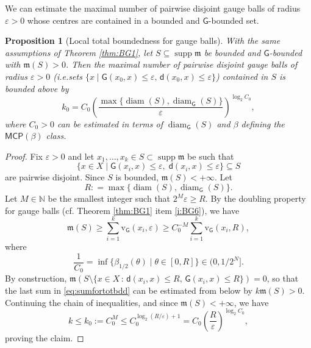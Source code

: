 \documentclass[11pt,a4paper]{article}
\theoremstyle{plain}
\newtheorem{proposition}[theorem]{Proposition}
\theoremstyle{definition}
\theoremstyle{remark}
\numberwithin{equation}{section}
\newcommand{\N}{\mathbb{N}} %
\DeclareMathOperator{\supp}{\mathrm{supp}}
\newcommand{\ve}{\varepsilon}
\newcommand{\MCP}{\mathsf{MCP}}
\newcommand{\rv}{\mathrm{v}}
\DeclareMathOperator{\diam}{\mathrm{diam}}
\newcommand{\mm}{\mathfrak m}
\newcommand{\sfd}{\mathsf d}
\newcommand{\sfG}{\mathsf G}
\begin{document}
We can estimate the maximal number of pairwise disjoint gauge balls of radius $\varepsilon>0$ whose centres are contained in a bounded and $\sfG$-bounded set.
\begin{proposition}[Local total boundedness for gauge balls]\label{prop:number-of-butt}
With the same assumptions of Theorem \ref{thm:BG1}, let $S\subseteq \supp\mm$ be bounded and $\sfG$-bounded with $\mm(S)>0$. Then the maximal number of pairwise disjoint gauge balls of radius $\varepsilon>0$ (i.e.\@ sets $\{x\mid \sfG(x_0,x)\leq \ve,\, \sfd(x_0,x)\leq \ve \}$) contained in $S$ is bounded above by
\begin{equation}
k_0= C_0 \left(\frac{\max\{\diam(S),\diam_{\sfG}(S)\}}{\varepsilon}\right)^{\log_2 C_0},
\end{equation}
where $C_0>0$ can be estimated in terms of $\diam_{\sfG}(S)$ and $\beta$ defining the $\MCP(\beta)$ class.
\end{proposition}
\begin{proof}
Fix $\varepsilon>0$ and let $x_1,\dots,x_k \in S\subset \supp \mm$ be such that 
\begin{equation}
\{x\in X \mid \sfG(x_i,x)\leq \varepsilon,\;\sfd(x_i,x)\leq \ve \} \subseteq S
\end{equation}
are pairwise disjoint. Since $S$ is bounded, $\mm(S)<+\infty$. Let 
\begin{equation}
R: = \max\{\diam(S),\diam_{\sfG}(S)\}.
\end{equation}
Let $M\in \N$ be the smallest integer such that $2^M\varepsilon \geq R$. By the doubling property for gauge balls (cf. Theorem \ref{thm:BG1} item \ref{i:BG6}), we have
\begin{equation}\label{eq:sumfortotbdd}
\mm(S)  \geq \sum_{i=1}^k \rv_{\sfG}(x_i,\varepsilon)  \geq C_{0}^{-M} \sum_{i=1}^k \rv_{\sfG}(x_i, R),
\end{equation}
where
\begin{equation}
\frac{1}{C_{0}} = \inf \{\beta_{1/2}(\theta)\mid \theta \in [0,R]\}\in (0,1/2^N].
\end{equation}
By construction,  $\mm(S\setminus \{x\in X\, :\, \sfd(x_{i}, x)\leq R, \, \sfG(x_{i}, x)\leq R \})=0$,  so that the last sum in \eqref{eq:sumfortotbdd} can be estimated from below  by $k \mm(S)>0$. Continuing the chain of inequalities, and since $\mm(S)<+\infty$, we have
\begin{equation}
k\leq k_0:=C_{0}^{M} \leq C_{0}^{\log_{2}(R/\ve)+1}=  C_0 \left(\frac{R}{\varepsilon}\right)^{\log_{2}C_{0}},
\end{equation}
proving the claim.
\end{proof}
\end{document}
